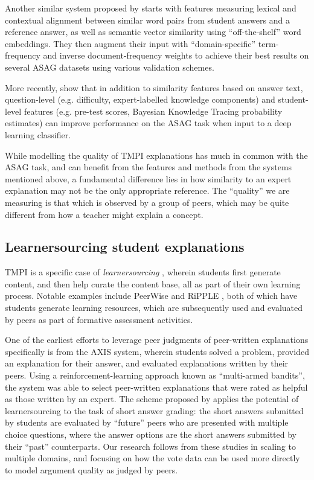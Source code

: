 \documentclass[notitlepage,12pt]{jedm}
\begin{document}
Another similar system proposed by \cite{sultan_fast_2016} starts with features 
measuring lexical and contextual alignment between similar word pairs from 
student answers and a reference answer, as well as semantic vector similarity 
using ``off-the-shelf'' word embeddings.  
They then augment their input with  ``domain-specific'' term-frequency and 
inverse document-frequency weights to achieve their best results on several 
ASAG datasets using various validation schemes.
 
More recently, \cite{zhang_deep_2016} show that in addition to similarity 
features based on answer text, question-level (e.g. difficulty, expert-labelled 
knowledge components) and student-level features (e.g. pre-test scores, 
Bayesian Knowledge Tracing probability estimates) can improve performance on 
the ASAG task when input to a deep learning classifier.

While modelling the quality of TMPI explanations has much in common with the 
ASAG task, and can benefit from the features and methods from the systems 
mentioned above, a fundamental difference lies in how similarity to an expert 
explanation may not be the only appropriate reference.
The ``quality'' we are measuring is that which is observed by a group of peers, 
which may be quite different from how a teacher might explain a concept.


\subsection{Learnersourcing student explanations}
TMPI is a specific case of  \textit{learnersourcing} 
\cite{weir_learnersourcing_2015}, wherein students first generate content, and 
then help curate the content base, all as part of their own learning process.
Notable examples include PeerWise \cite{denny_peerwise:_2008} and RiPPLE 
\cite{khosravi_ripple_2019}, both of which have students generate learning 
resources, which are subsequently used and evaluated by peers as part of 
formative assessment activities.

One of the earliest efforts to leverage peer judgments of peer-written 
explanations specifically is from the AXIS system\cite{williams_axis:_2016}, 
wherein students solved a problem, provided an explanation for their answer, 
and evaluated explanations written by their peers.
Using a reinforcement-learning approach known as ``multi-armed bandits'', the 
system was able to select peer-written explanations that were rated as helpful 
as those written by an expert.
The scheme proposed by \cite{kolhe_peer_2016} applies the potential of 
learnersourcing to the task of short answer grading: the short answers 
submitted by students are evaluated by ``future'' peers who are presented with 
multiple choice questions, where the answer options are the short answers 
submitted by their ``past'' counterparts.
Our research follows from these studies in scaling to multiple domains, and 
focusing on how the vote data can be used more directly to model argument 
quality as judged by peers.
\end{document}
